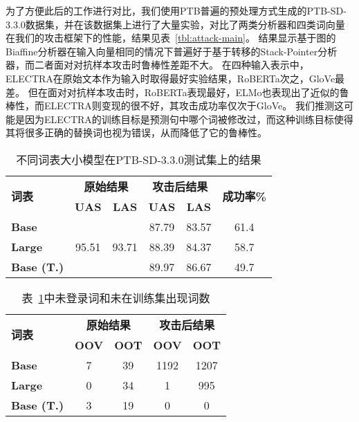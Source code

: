为了方便此后的工作进行对比，我们使用PTB普遍的预处理方式生成的PTB-SD-3.3.0数据集，并在该数据集上进行了大量实验，对比了两类分析器和四类词向量在我们的攻击框架下的性能，结果见表~\ref{tbl:attack-main}。
结果显示基于图的Biaffine分析器在输入向量相同的情况下普遍好于基于转移的Stack-Pointer分析器，而二者面对对抗样本攻击时鲁棒性差距不大。
在四种输入表示中，ELECTRA在原始文本作为输入时取得最好实验结果，RoBERTa次之，GloVe最差。
但在面对对抗样本攻击时，RoBERTa表现最好，ELMo也表现出了近似的鲁棒性，而ELECTRA则变现的很不好，其攻击成功率仅次于GloVe。
我们推测这可能是因为ELECTRA的训练目标是预测句中哪个词被修改过，而这种训练目标使得其将很多正确的替换词也视为错误，从而降低了它的鲁棒性。


\begin{table}[h]
	\centering
	\small
	\renewcommand{\arraystretch}{1.2}
	\begin{tabular}{l||cc|cc|c}
		\hline
		\multirow{2}{*}{\bf 词表}& \multicolumn{2}{c|}{\bf 原始结果} & \multicolumn{2}{c|}{\bf 攻击后结果} & \multirow{2}{*}{\bf 成功率\%} \\
		\cline{2-5}
		& \bf UAS & \bf LAS & \bf UAS & \bf LAS & \\
		\hline
		\bf Base &\multirow{3}{*}{95.51} & \multirow{3}{*}{93.71} &87.79 &83.57 &61.4 \\
		\bf Large  & & &88.39 &84.37 &58.7 \\
		\bf Base (T.) && &89.97 &86.67 &49.7 \\
		\hline
	\end{tabular}
	\caption{不同词表大小模型在PTB-SD-3.3.0测试集上的结果} 
	\label{tbl:oov-oot-result}
\end{table}

\begin{table}[h]
	\centering
	\small
	\renewcommand{\arraystretch}{1.2}
	\begin{tabular}{l||cc|cc}
		\hline
		\multirow{2}{*}{\bf 词表}& \multicolumn{2}{c|}{\bf 原始结果} & \multicolumn{2}{c}{\bf 攻击后结果}  \\
		\cline{2-5}
		& \bf OOV & \bf OOT & \bf OOV & \bf OOT \\
		\hline
		\bf Base &7 &39 &1192 &1207 \\
		\bf Large  &0 &34 &1 &995  \\
		\bf Base (T.) &3 &19 &0 &0 \\
		\hline
	\end{tabular}
	\caption{表~\ref{tbl:oov-oot-result}中未登录词和未在训练集出现词数}
	\label{tbl:oov-oot-num}
\end{table}

